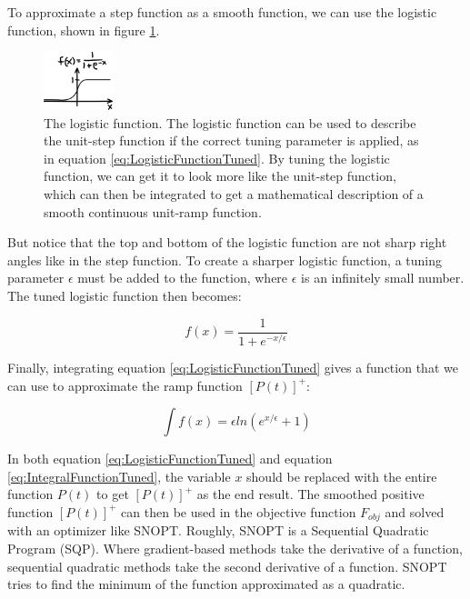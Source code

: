 To approximate a step function as a smooth function, we can use the logistic function, shown in figure \ref{fig:LogisticFunction}.

\begin{figure}[h]		%
\begin{centering}
\includegraphics[width=0.18\textwidth]{Figures/LogisticFunction}\par
\end{centering}
\caption[Plot: the Logistic Function]{The logistic function. The logistic function can be used to describe the unit-step function if the correct tuning parameter is applied, as in equation \ref{eq:LogisticFunctionTuned}. By tuning the logistic function, we can get it to look more like the unit-step function, which can then be integrated to get a mathematical description of a smooth continuous unit-ramp function.}
\label{fig:LogisticFunction}
\end{figure}
%

But notice that the top and bottom of the logistic function are not sharp right angles like in the step function. To create a sharper logistic function, a tuning parameter $\epsilon$ must be added to the function, where $\epsilon$ is an infinitely small number. The tuned logistic function then becomes:

\begin{equation}
f(x)= \frac{1}{1+e^{-x/\epsilon}}
\label{eq:LogisticFunctionTuned}
\end{equation}

Finally, integrating equation \ref{eq:LogisticFunctionTuned} gives a function that we can use to approximate the ramp function $[P(t)]^{+}$:

\begin{equation}
\int f(x) = \epsilon ln(e^{x/\epsilon}+1)
\label{eq:IntegralFunctionTuned}
\end{equation}

In both equation \ref{eq:LogisticFunctionTuned} and equation \ref{eq:IntegralFunctionTuned}, the variable $x$ should be replaced with the entire function $P(t)$ to get $[P(t)]^{+}$ as the end result. The smoothed positive function $[P(t)]^{+}$ can then be used in the objective function $F_{obj}$ and solved with an optimizer like SNOPT. Roughly, SNOPT is a Sequential Quadratic Program (SQP). Where gradient-based methods take the derivative of a function, sequential quadratic methods take the second derivative of a function. SNOPT tries to find the minimum of the function approximated as a quadratic. 
